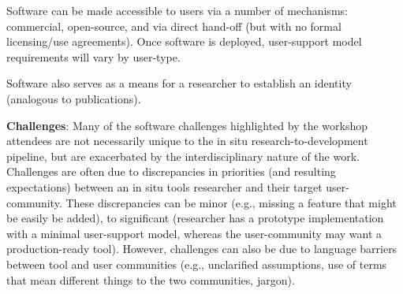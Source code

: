 Software can be made accessible to users via a number of mechanisms: commercial, open-source, and via direct hand-off (but with no formal licensing/use agreements). Once software is deployed, user-support model requirements will vary by user-type. 

Software also serves as a means for a researcher to establish an identity (analogous to publications).

\textbf{Challenges}: Many of the software challenges highlighted by the workshop attendees are not necessarily unique to the in situ research-to-development pipeline, but are exacerbated by the interdisciplinary nature of the work.  Challenges are often due to discrepancies in priorities (and resulting expectations) between an in situ tools researcher and their target user-community. These discrepancies can be minor (e.g., missing a feature that might be easily be added), to significant (researcher has a prototype implementation with a minimal user-support model, whereas the user-community may want a production-ready tool). However, challenges can also be due to language barriers between tool and user communities (e.g., unclarified assumptions, use of terms that mean different things to the two communities, jargon).   


